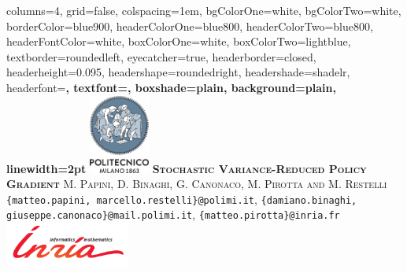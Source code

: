 \documentclass[landscape,a0paper,fontscale=0.32]{baposter}
\begin{document}
\begin{poster}%
  {
  columns=4,
  grid=false,
  colspacing=1em,
  bgColorOne=white,
  bgColorTwo=white,
  borderColor=blue900,
  headerColorOne=blue800,
  headerColorTwo=blue800,
  headerFontColor=white,
  boxColorOne=white,
  boxColorTwo=lightblue,
  textborder=roundedleft,
  eyecatcher=true,
  headerborder=closed,
  headerheight=0.095\textheight,
  headershape=roundedright,
  headershade=shadelr,
  headerfont=\large\bf\textsc, %
  textfont={\setlength{\parindent}{1.5em}},
  boxshade=plain,
  background=plain,
  linewidth=2pt
  }
  {\includegraphics[height=7.0em]{./pics/polilogo/logoPoliBlue_poster.png}}
  {\bf\textsc{Stochastic Variance-Reduced Policy Gradient}\vspace{0.1em}}
  {\textsc{M. Papini, D. Binaghi, G. Canonaco, M. Pirotta and M. Restelli}\\ 
  {\normalsize \texttt{\{matteo.papini, marcello.restelli\}@polimi.it}},
  {\normalsize \texttt{\{damiano.binaghi, giuseppe.canonaco\}@mail.polimi.it}},  {\normalsize \texttt{\{matteo.pirotta\}@inria.fr}}
  }
  {%
    \includegraphics[height=4em]{./pics/inria_sc}
  }

    \newcommand{\colouredcircle}{%
      \tikz{\useasboundingbox (-0.2em,-0.32em) rectangle(0.2em,0.32em); \draw[draw=black,fill=lightblue,line width=0.03em] (0,0) circle(0.18em);}}


\end{poster}
\end{document}

